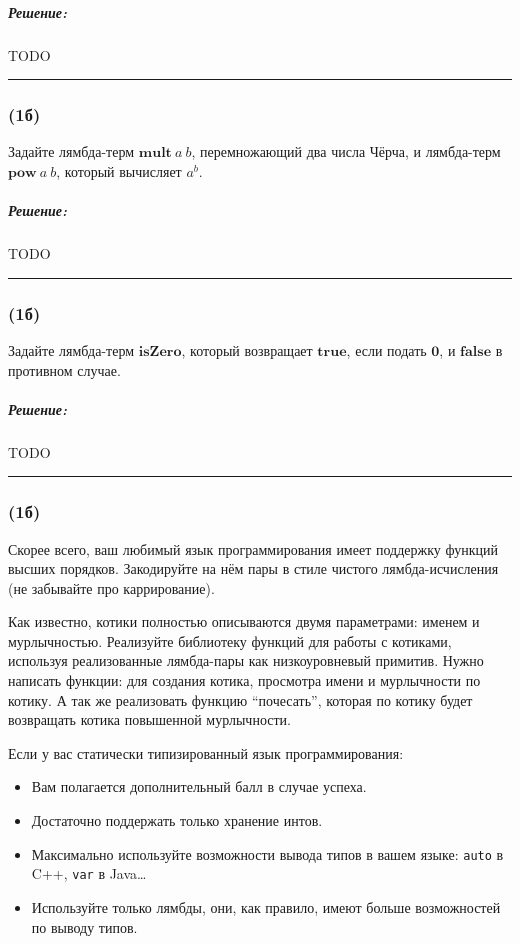 \documentclass{article}
\newenvironment{proof}{\subparagraph{\hspace{-1em}Решение:\newline}}{\par\noindent\rule{\textwidth}{0.4pt}}
\newcommand{\term}[1]{\mathbf{#1}}
\begin{document}
    \begin{proof}
        TODO %
    \end{proof}

    \subsubsection{(1б)}

    Задайте лямбда-терм $\term{mult}~a~b$, перемножающий два числа Чёрча, и лямбда-терм $\term{pow}~a~b$, который вычисляет $a^b$.

    \begin{proof}
        TODO %
    \end{proof}

    \subsubsection{(1б)}

    Задайте лямбда-терм $\term{isZero}$, который возвращает $\term{true}$, если подать $\term{0}$, и $\term{false}$ в противном случае.

    \begin{proof}
        TODO %
    \end{proof}

    \subsubsection{(1б)}

    Скорее всего, ваш любимый язык программирования имеет поддержку функций высших порядков.
    Закодируйте на нём пары в стиле чистого лямбда-исчисления (не забывайте про каррирование).

    Как известно, котики полностью описываются двумя параметрами: именем и мурлычностью.
    Реализуйте библиотеку функций для работы с котиками, используя реализованные лямбда-пары как низкоуровневый примитив.
    Нужно написать функции: для создания котика, просмотра имени и мурлычности по котику.
    А так же реализовать функцию ``почесать'', которая по котику будет возвращать котика повышенной мурлычности.

    Если у вас статически типизированный язык программирования:
    \begin{itemize}
        \item Вам полагается дополнительный балл в случае успеха.
        \item Достаточно поддержать только хранение интов.
        \item Максимально используйте возможности вывода типов в вашем языке: \texttt{auto} в C++, \texttt{var} в Java\ldots
        \item Используйте только лямбды, они, как правило, имеют больше возможностей по выводу типов.
    \end{itemize}
\end{document}
